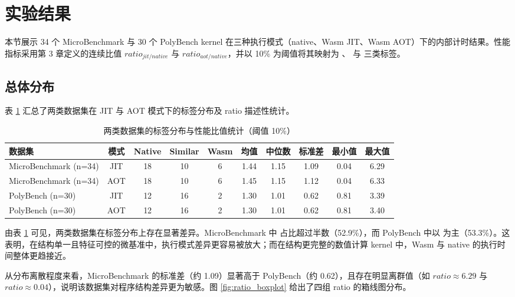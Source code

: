 \section{实验结果}

本节展示 34 个 MicroBenchmark 与 30 个 PolyBench kernel 在三种执行模式（native、Wasm JIT、Wasm AOT）下的内部计时结果。性能指标采用第 3 章定义的连续比值 $ratio_{jit/native}$ 与 $ratio_{aot/native}$，并以 10\% 为阈值将其映射为 、 与  三类标签。

\subsection{总体分布}

表 \ref{tab:overall_stats} 汇总了两类数据集在 JIT 与 AOT 模式下的标签分布及 ratio 描述性统计。


\begin{table}[htbp]
\centering
\caption{两类数据集的标签分布与性能比值统计（阈值 10\%）}
\small
\setlength{\tabcolsep}{3pt}
\begin{tabular}{lccccccccc}
\toprule
数据集 & 模式 & Native & Similar & Wasm & 均值 & 中位数 & 标准差 & 最小值 & 最大值 \\
\midrule
MicroBenchmark (n=34) & JIT & 18 & 10 & 6 & 1.44 & 1.15 & 1.09 & 0.04 & 6.29 \\
MicroBenchmark (n=34) & AOT & 18 & 10 & 6 & 1.45 & 1.15 & 1.12 & 0.04 & 6.33 \\
PolyBench (n=30) & JIT & 12 & 16 & 2 & 1.30 & 1.01 & 0.62 & 0.81 & 3.39 \\
PolyBench (n=30) & AOT & 12 & 16 & 2 & 1.30 & 1.01 & 0.62 & 0.81 & 3.40 \\
\bottomrule
\end{tabular}
\label{tab:overall_stats}
\end{table}

由表 \ref{tab:overall_stats} 可见，两类数据集在标签分布上存在显著差异。MicroBenchmark 中  占比超过半数（52.9\%），而 PolyBench 中以  为主（53.3\%）。这表明，在结构单一且特征可控的微基准中，执行模式差异更容易被放大；而在结构更完整的数值计算 kernel 中，Wasm 与 native 的执行时间整体更趋接近。

从分布离散程度来看，MicroBenchmark 的标准差（约 1.09）显著高于 PolyBench（约 0.62），且存在明显离群值（如 $ratio \approx 6.29$ 与 $ratio \approx 0.04$），说明该数据集对程序结构差异更为敏感。图 \ref{fig:ratio_boxplot} 给出了四组 ratio 的箱线图分布。


